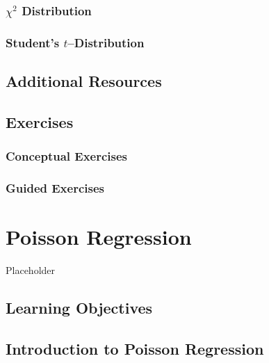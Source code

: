 \documentclass[
]{krantz}
\begin{document}
\hypertarget{chi2-distribution}{%
\subsection{\texorpdfstring{\(\chi^2\) Distribution}{\textbackslash chi\^{}2 Distribution}}\label{chi2-distribution}}

\hypertarget{students-tdistribution}{%
\subsection{\texorpdfstring{Student's \(t\)--Distribution}{Student's t--Distribution}}\label{students-tdistribution}}

\hypertarget{additional-resources}{%
\section{Additional Resources}\label{additional-resources}}

\hypertarget{exercises-2}{%
\section{Exercises}\label{exercises-2}}

\hypertarget{conceptual-exercises-2}{%
\subsection{Conceptual Exercises}\label{conceptual-exercises-2}}

\hypertarget{guided-exercises-1}{%
\subsection{Guided Exercises}\label{guided-exercises-1}}

\hypertarget{ch-poissonreg}{%
\chapter{Poisson Regression}\label{ch-poissonreg}}

Placeholder

\hypertarget{learning-objectives-3}{%
\section{Learning Objectives}\label{learning-objectives-3}}

\hypertarget{introduction-to-poisson-regression}{%
\section{Introduction to Poisson Regression}\label{introduction-to-poisson-regression}}
\end{document}
